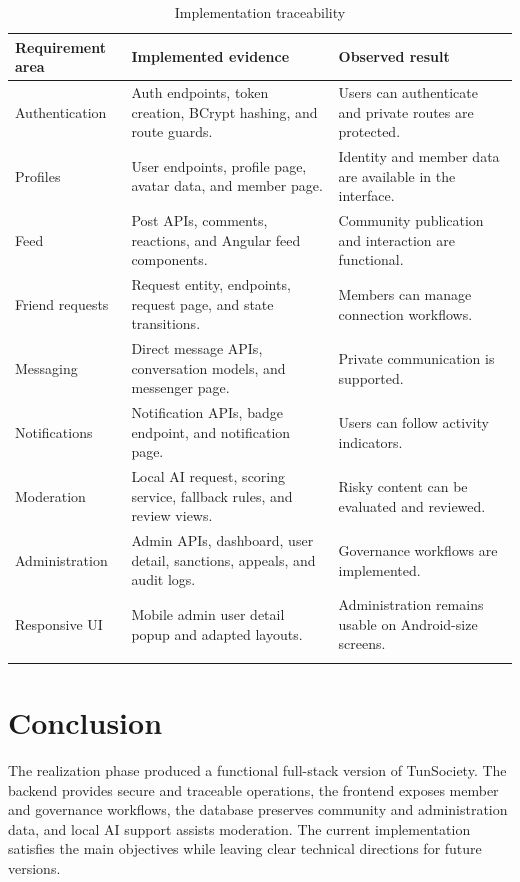 \begin{longtable}{|m{3.5cm}|m{5.2cm}|m{5.3cm}|}
\hline
\textbf{Requirement area} & \textbf{Implemented evidence} & \textbf{Observed result} \\
\hline
Authentication & Auth endpoints, token creation, BCrypt hashing, and route guards. & Users can authenticate and private routes are protected. \\
\hline
Profiles & User endpoints, profile page, avatar data, and member page. & Identity and member data are available in the interface. \\
\hline
Feed & Post APIs, comments, reactions, and Angular feed components. & Community publication and interaction are functional. \\
\hline
Friend requests & Request entity, endpoints, request page, and state transitions. & Members can manage connection workflows. \\
\hline
Messaging & Direct message APIs, conversation models, and messenger page. & Private communication is supported. \\
\hline
Notifications & Notification APIs, badge endpoint, and notification page. & Users can follow activity indicators. \\
\hline
Moderation & Local AI request, scoring service, fallback rules, and review views. & Risky content can be evaluated and reviewed. \\
\hline
Administration & Admin APIs, dashboard, user detail, sanctions, appeals, and audit logs. & Governance workflows are implemented. \\
\hline
Responsive UI & Mobile admin user detail popup and adapted layouts. & Administration remains usable on Android-size screens. \\
\hline
\caption{Implementation traceability}
\end{longtable}

\section{Conclusion}

The realization phase produced a functional full-stack version of TunSociety. The backend provides secure and traceable operations, the frontend exposes member and governance workflows, the database preserves community and administration data, and local AI support assists moderation. The current implementation satisfies the main objectives while leaving clear technical directions for future versions.
